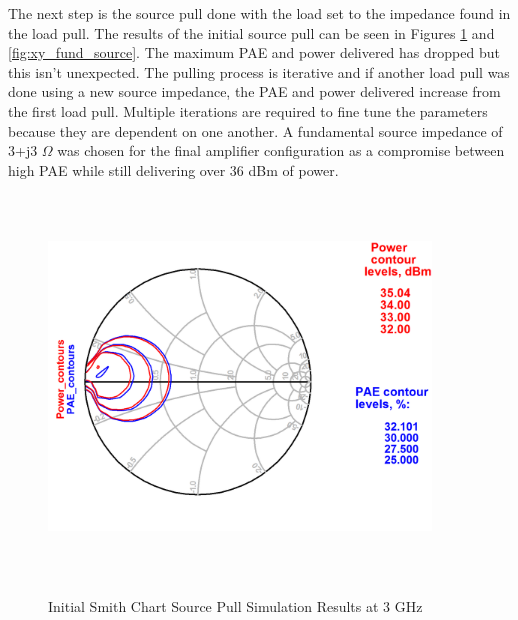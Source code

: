 
The next step is the source pull done with the load set to the impedance found in the load pull. The results of the initial source pull can be seen in Figures \ref{fig:smith_fund_source} and \ref{fig:xy_fund_source}. The maximum PAE and power delivered has dropped but this isn't unexpected. The pulling process is iterative and if another load pull was done using a new source impedance, the PAE and power delivered increase from the first load pull. Multiple iterations are required to fine tune the parameters because they are dependent on one another. A fundamental source impedance of 3+j3 $\Omega$ was chosen for the final amplifier configuration as a compromise between high PAE while still delivering over 36 dBm of power.

\begin{figure}
  \centering
  \includegraphics[width=4in,height=4in,keepaspectratio]{figures/simulation/smith_fund_source}\\
  \caption{Initial Smith Chart Source Pull Simulation Results at 3 GHz}
  \label{fig:smith_fund_source}

  \vspace*{\floatsep}


\end{figure}
